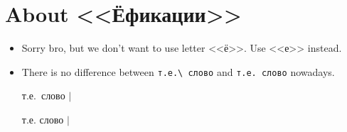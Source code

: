\documentclass[a5paper,openany,9pt]{extbook}
\begin{document}
\section{About <<Ёфикации>>}
\begin{itemize}
\item
Sorry bro, but we don't want to use letter <<ё>>. Use <<е>> instead.
\item 
There is no difference between \verb=т.е.\ слово= and \verb=т.е. слово= nowadays. 

\begin{center}
т.е.\ слово $\Bigr|$
\end{center}
\begin{center}
т.е. слово $\Bigr|$
\end{center}
\end{itemize}




\newpage
\end{document}
